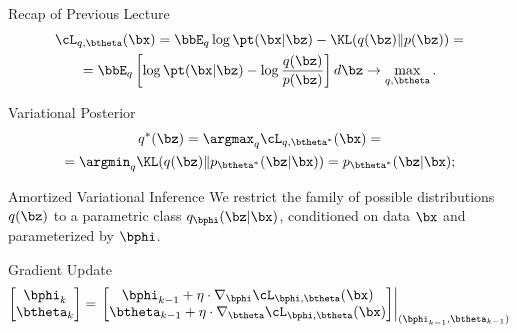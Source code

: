 \documentclass{beamer}
\begin{document}
\begin{frame}{Recap of Previous Lecture}
	\vspace{-0.5cm}
	\begin{multline*}
		\cL_{q, \btheta}(\bx)  =  \bbE_{q} \log \pt(\bx | \bz) - \KL (q(\bz) \| p(\bz)) = \\ = \bbE_q \left[ \log \pt(\bx | \bz) - \log \frac{q(\bz)}{p(\bz)} \right]d\bz \rightarrow \max_{q, \btheta}.
	\end{multline*}
	\vspace{-0.5cm}
	\begin{block}{Variational Posterior}
		\vspace{-0.7cm}
		\begin{multline*}
			q^*(\bz) = \argmax_q \cL_{q, \btheta^*}(\bx) = \\
			= \argmin_q \KL(q(\bz) \| p_{\btheta^*}(\bz | \bx)) = p_{\btheta^*}(\bz| \bx);
		\end{multline*}
		\vspace{-0.7cm}
	\end{block}
	\begin{block}{Amortized Variational Inference}
			We restrict the family of possible distributions $q(\bz)$ to a parametric class $q_{\bphi}(\bz| \bx)$, {\color{teal}conditioned on data $\bx$} and {\color{violet}parameterized by $\bphi$}.
	\end{block}
	\begin{block}{Gradient Update}
		\[
			\begin{bmatrix}
				\bphi_k \\
				\btheta_k
			\end{bmatrix}
			= \left.
			\begin{bmatrix}
				\bphi_{k-1} + \eta \cdot \nabla_{\bphi} \cL_{\bphi, \btheta}(\bx) \\
				\btheta_{k-1} + \eta \cdot \nabla_{\btheta} \cL_{\bphi, \btheta}(\bx)
			\end{bmatrix}
			\right|_{(\bphi_{k-1}, \btheta_{k-1})}
		\]
	\end{block}
\end{frame}
\end{document}
